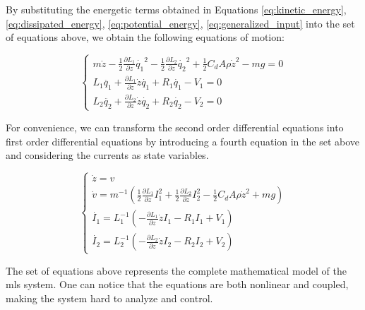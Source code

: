 By substituting the energetic terms obtained in Equations \ref{eq:kinetic_energy}, \ref{eq:dissipated_energy}, \ref{eq:potential_energy}, \ref{eq:generalized_input} into the set of equations above, we obtain the following equations of motion:

\begin{equation}
    \begin{cases}
        m \ddot{z} - \frac{1}{2} \frac{\partial L_1}{\partial z} \dot{q_1}^2 - \frac{1}{2} \frac{\partial L_2}{\partial z} \dot{q_2}^2 + \frac{1}{2} C_d A \rho \dot{z}^2 - m g = 0 \\
        L_1 \ddot{q_1} + \frac{\partial L_1}{\partial z} \dot{z} \dot{q_1} + R_1 \dot{q_1} - V_1 = 0                                                                                \\
        L_2 \ddot{q_2} + \frac{\partial L_2}{\partial z} \dot{z} \dot{q_2} + R_2 \dot{q_2} - V_2 = 0
    \end{cases}
\end{equation}

For convenience, we can transform the second order differential equations into first order differential equations by introducing a fourth equation in the set above and considering the currents as state variables.

\begin{equation}
    \begin{cases}
        \dot{z} = v                                                                                                                                                                    \\
        \dot{v} = m^{-1} \left(\frac{1}{2} \frac{\partial L_1}{\partial z} I_1^2 + \frac{1}{2} \frac{\partial L_2}{\partial z} I_2^2 - \frac{1}{2} C_d A \rho \dot{z}^2 + m g  \right) \\
        \dot{I_1} = L_1^{-1} \left(- \frac{\partial L_1}{\partial z} \dot{z} I_1 - R_1 I_1 + V_1 \right)                                                                               \\
        \dot{I_2} = L_2^{-1} \left(- \frac{\partial L_2}{\partial z} \dot{z} I_2 - R_2 I_2 + V_2 \right)
    \end{cases}
    \label{eq:equations_of_motion}
\end{equation}

The set of equations above represents the complete mathematical model of the \acrshort{mls} system.
One can notice that the equations are both nonlinear and coupled, making the system hard to analyze and control.

